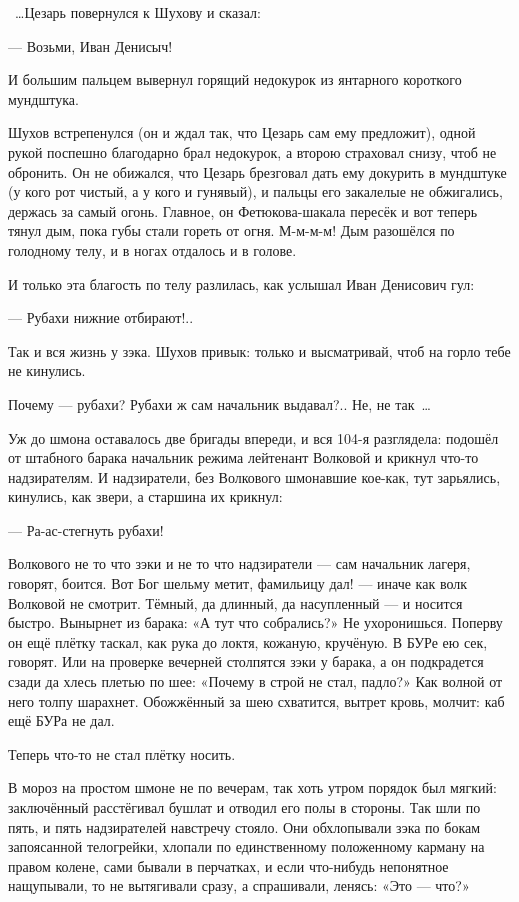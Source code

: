 ~\dots{}Цезарь повернулся к Шухову и сказал:

--- Возьми, Иван Денисыч!

И большим пальцем вывернул горящий недокурок из янтарного короткого мундштука.

Шухов встрепенулся (он и ждал так, что Цезарь сам ему предложит), одной рукой поспешно благодарно брал недокурок, а второю страховал снизу, чтоб не обронить. Он не обижался, что Цезарь брезговал дать ему докурить в мундштуке (у кого рот чистый, а у кого и гунявый), и пальцы его закалелые не обжигались, держась за самый огонь. Главное, он Фетюкова-шакала пересёк и вот теперь тянул дым, пока губы стали гореть от огня. М-м-м-м! Дым разошёлся по голодному телу, и в ногах отдалось и в голове.

И только эта благость по телу разлилась, как услышал Иван Денисович гул:

--- Рубахи нижние отбирают!..

Так и вся жизнь у зэка. Шухов привык: только и высматривай, чтоб на горло тебе не кинулись.

Почему --- рубахи? Рубахи ж сам начальник выдавал?.. Не, не так~\dots{}

Уж до шмона оставалось две бригады впереди, и вся 104-я разглядела: подошёл от штабного барака начальник режима лейтенант Волковой и крикнул что-то надзирателям. И надзиратели, без Волкового шмонавшие кое-как, тут зарьялись, кинулись, как звери, а старшина их крикнул:

--- Ра-ас-стегнуть рубахи!

Волкового не то что зэки и не то что надзиратели --- сам начальник лагеря, говорят, боится. Вот Бог шельму метит, фамильицу дал! --- иначе как волк Волковой не смотрит. Тёмный, да длинный, да насупленный --- и носится быстро. Вынырнет из барака: «А тут что собрались?» Не ухоронишься. Поперву он ещё плётку таскал, как рука до локтя, кожаную, кручёную. В БУРе ею сек, говорят. Или на проверке вечерней столпятся зэки у барака, а он подкрадется сзади да хлесь плетью по шее: «Почему в строй не стал, падло?» Как волной от него толпу шарахнет. Обожжённый за шею схватится, вытрет кровь, молчит: каб ещё БУРа не дал.

Теперь что-то не стал плётку носить.

В мороз на простом шмоне не по вечерам, так хоть утром порядок был мягкий: заключённый расстёгивал бушлат и отводил его полы в стороны. Так шли по пять, и пять надзирателей навстречу стояло. Они обхлопывали зэка по бокам запоясанной телогрейки, хлопали по единственному положенному карману на правом колене, сами бывали в перчатках, и если что-нибудь непонятное нащупывали, то не вытягивали сразу, а спрашивали, ленясь: «Это --- что?»

